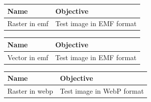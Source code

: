 \documentclass[11pt,a4paper]{article}
\begin{document}
\begin{figure}[h]
\end{figure}

\begin{table}[h]
\begin{tabular}{|l|l|}
\hline
Name & Objective \\ \hline
Raster in emf & Test image in EMF format \\ \hline
\end{tabular}
\end{table}

\begin{figure}[h]
\end{figure}

\begin{table}[h]
\begin{tabular}{|l|l|}
\hline
Name & Objective \\ \hline
Vector in emf & Test image in EMF format \\ \hline
\end{tabular}
\end{table}

\begin{figure}[h]
\end{figure}

\begin{table}[h]
\begin{tabular}{|l|l|}
\hline
Name & Objective \\ \hline
Raster in webp & Test image in WebP format \\ \hline
\end{tabular}
\end{table}
\end{document}
